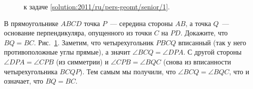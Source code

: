 \ifsolution
\begin{figure}\centering
    \caption{к задаче \ref{solution:2011/ru/pers-geomt/senior/1}.}
    \label{fig:solution:2011/ru/pers-geomt/senior/1}
\end{figure}
\fi %

\problem
В прямоугольнике $ABCD$ точка $P$~--- середина стороны $AB$, а точка
$Q$~--- основание перпендикуляра, опущенного из точки $C$ на $PD$.
Докажите, что $BQ = BC$.
\solution
\label{solution:2011/ru/pers-geomt/senior/1}%
Рис.~\ref{fig:solution:2011/ru/pers-geomt/senior/1}.
Заметим, что четырехугольник $PBCQ$ вписанный
(так у него противоположные углы прямые),
а значит $\angle BCQ = \angle DPA$.
С другой стороны $\angle DPA = \angle CPB$ (из симметрии) и
$\angle CPB = \angle BQC$ (снова из вписанности четырехугольника $BCQP$).
Тем самым мы получили, что $\angle BCQ = \angle BQC$, что и означает, что
$BQ = BC$.
\endproblem
